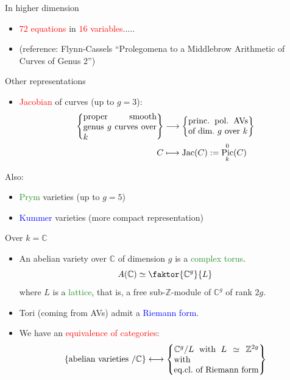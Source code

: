 \documentclass[usenames,dvipsnames]{beamer}
\def\Z{\mathbb{Z}}
\def\C{\mathbb{C}}
\DeclareMathOperator{\Pic}{Pic}
\DeclareMathOperator{\Jac}{Jac}
\newcommand{\set}[1]{\left\lbrace#1\right\rbrace }
\newcommand{\red}[1]{\textcolor{red}{#1}}
\newcommand{\blue}[1]{\textcolor{blue}{#1}}
\newcommand{\green}[1]{\textcolor{ForestGreen}{#1}}
\begin{document}
{

}

{

}

{

}

\begin{frame}{ In higher dimension }
\begin{itemize}\setlength\itemsep{2em}
	\item \red{$72$ equations} in  \red{$16$ variables}.....
	\item (reference: Flynn-Cassels ``Prolegomena to a Middlebrow Arithmetic of Curves of Genus 2'')
\end{itemize}
\end{frame}

\begin{frame}{ Other representations }
\begin{itemize}
	\item \red{Jacobian} of curves (up to $g=3$):
	\begin{align*}
		\set{\parbox{8.6em}{proper smooth genus $g$ curves over $k$}} & \longrightarrow \set{\parbox{7em}{princ.~pol.~AVs of dim.~$g$ over $k$}} \\
			C & \longmapsto \Jac(C):=\Pic^0_k(C)
	\end{align*}
\end{itemize}
\pause Also:
	\begin{itemize}
		\pause \item \green{Prym} varieties (up to $g=5$)
		\pause \item \blue{Kummer} varieties (more compact representation)
	\end{itemize}
\end{frame}

\begin{frame}{ Over $k=\C$ }
\begin{itemize}
	\item An abelian variety over $\C$ of dimension $g$ is a \green{complex torus}.
	\[ A(\C) \simeq \faktor{\C^g}{L} \]
	where $L$ is a \green{lattice}, that is, a free sub-$\Z$-module of $\C^g$ of rank $2g$.
	\pause \item Tori (coming from AVs) admit a \blue{Riemann form}.
	\pause \item We have an \red{equivalence of categories}:
	\[
      \set{ \text{abelian varieties $/\C$} } \longleftrightarrow 
      \set{\parbox[c]{10em}{$\C^g/L$ with $L\simeq \Z^{2g}$ with\\eq.cl.~of Riemann form}}
 	\]
\end{itemize}
\end{frame}
\end{document}
